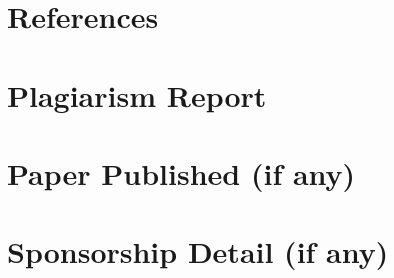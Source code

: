 \documentclass[12pt,a4]{report}
\makeatletter
\def\@makechapterhead#1{%
  \vspace*{\fill}%
  \begin{center}
    {\Huge\bfseries CHAPTER \thechapter\\[1.5ex]#1}
  \end{center}
  \thispagestyle{chaptertitle}%
  \vspace*{\fill}
  \clearpage
}
\makeatother
\begin{document}
\clearpage
{}
\pagestyle{empty}

\makeatletter
\renewcommand{\@chapapp}{Annexure}
\renewcommand{\thechapter}{\Alph{chapter}}
\makeatother

\makeatletter
\renewcommand{\@makechapterhead}[1]{%
  \vspace*{\fill}%
  \begin{center}
    {\Huge\bfseries Annexure \thechapter\\[1.5ex]#1}
  \end{center}
  \thispagestyle{chaptertitle}%
  \vspace*{\fill}
  \clearpage
}
\makeatother

\begin{appendices}
\chapter{References}

\chapter{Plagiarism Report}
\chapter{Paper Published (if any)}
\chapter{Sponsorship Detail (if any)}
\end{appendices}
\end{document}
